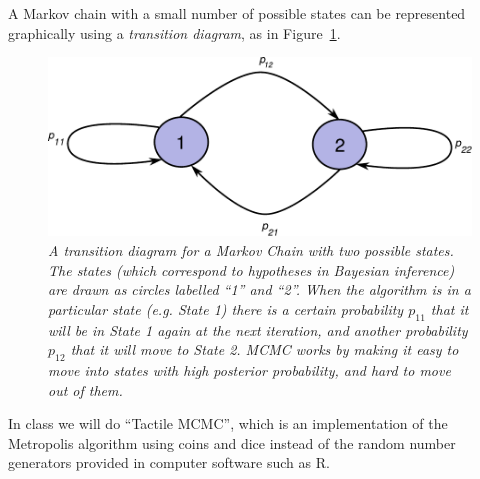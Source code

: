 A Markov chain with a small number of possible states can be represented
graphically using a {\it transition diagram}, as in
Figure~\ref{fig:transitions}.

\begin{figure}[ht!]
\begin{center}
\includegraphics[scale=0.65]{Figures/transitions.pdf}
\caption{\it A transition diagram for a Markov Chain with two possible states.
The states (which correspond to hypotheses in Bayesian inference) are drawn
as circles labelled ``1'' and ``2''. When the algorithm is in a particular state
(e.g. State 1) there is a certain probability $p_{11}$ that it will be in State
1 again at the next iteration, and another probability $p_{12}$ that it will
move to State 2. MCMC works by making it easy to move into states with high
posterior probability, and hard to move out of them.
\label{fig:transitions}}
\end{center}
\end{figure}


In class we will do ``Tactile MCMC'', which is an implementation of the
Metropolis algorithm using coins and dice instead of the random number generators
provided in computer software such as R.

